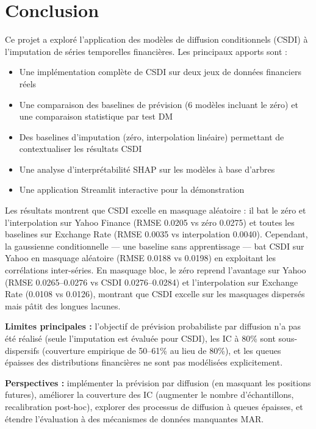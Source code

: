 \documentclass[12pt,a4paper]{article}
\begin{document}
\section{Conclusion}

Ce projet a explor\'e l'application des mod\`eles de diffusion conditionnels (CSDI) \`a l'imputation de s\'eries temporelles financi\`eres. Les principaux apports sont :

\begin{itemize}
    \item Une impl\'ementation compl\`ete de CSDI sur deux jeux de donn\'ees financiers r\'eels
    \item Une comparaison des baselines de pr\'evision (6 mod\`eles incluant le z\'ero) et une comparaison statistique par test DM
    \item Des baselines d'imputation (z\'ero, interpolation lin\'eaire) permettant de contextualiser les r\'esultats CSDI
    \item Une analyse d'interpr\'etabilit\'e SHAP sur les mod\`eles \`a base d'arbres
    \item Une application Streamlit interactive pour la d\'emonstration
\end{itemize}

Les r\'esultats montrent que CSDI excelle en masquage al\'eatoire : il bat le z\'ero et l'interpolation sur Yahoo Finance (RMSE 0.0205 vs z\'ero 0.0275) et toutes les baselines sur Exchange Rate (RMSE 0.0035 vs interpolation 0.0040). Cependant, la gaussienne conditionnelle --- une baseline sans apprentissage --- bat CSDI sur Yahoo en masquage al\'eatoire (RMSE 0.0188 vs 0.0198) en exploitant les corr\'elations inter-s\'eries. En masquage bloc, le z\'ero reprend l'avantage sur Yahoo (RMSE 0.0265--0.0276 vs CSDI 0.0276--0.0284) et l'interpolation sur Exchange Rate (0.0108 vs 0.0126), montrant que CSDI excelle sur les masquages dispers\'es mais p\^atit des longues lacunes.

\textbf{Limites principales :} l'objectif de pr\'evision probabiliste par diffusion n'a pas \'et\'e r\'ealis\'e (seule l'imputation est \'evalu\'ee pour CSDI), les IC \`a 80\% sont sous-dispersifs (couverture empirique de 50--61\% au lieu de 80\%), et les queues \'epaisses des distributions financi\`eres ne sont pas mod\'elis\'ees explicitement.

\textbf{Perspectives :} impl\'ementer la pr\'evision par diffusion (en masquant les positions futures), am\'eliorer la couverture des IC (augmenter le nombre d'\'echantillons, recalibration post-hoc), explorer des processus de diffusion \`a queues \'epaisses, et \'etendre l'\'evaluation \`a des m\'ecanismes de donn\'ees manquantes MAR.
\end{document}
